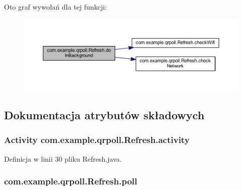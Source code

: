 Oto graf wywołań dla tej funkcji\+:
\nopagebreak
\begin{figure}[H]
\begin{center}
\leavevmode
\includegraphics[width=350pt]{classcom_1_1example_1_1qrpoll_1_1_refresh_a2f33f8eb0e87c2ed2ff6358486d99424_cgraph}
\end{center}
\end{figure}




\subsection{Dokumentacja atrybutów składowych}
\hypertarget{classcom_1_1example_1_1qrpoll_1_1_refresh_aa3e22cc50197adde6465dd4cb0ce8db5}{
\subsubsection[{activity}]{\setlength{\rightskip}{0pt plus 5cm}Activity com.\+example.\+qrpoll.\+Refresh.\+activity\hspace{0.3cm}{\ttfamily [private]}}}\label{classcom_1_1example_1_1qrpoll_1_1_refresh_aa3e22cc50197adde6465dd4cb0ce8db5}


Definicja w linii 30 pliku Refresh.\+java.

\hypertarget{classcom_1_1example_1_1qrpoll_1_1_refresh_a72a1aeb64069e0a0579733c97bb211b3}{
\subsubsection[{poll}]{ com.\+example.\+qrpoll.\+Refresh.\+poll\hspace{0.3cm}{\ttfamily [private]}}}\label{classcom_1_1example_1_1qrpoll_1_1_refresh_a72a1aeb64069e0a0579733c97bb211b3}


